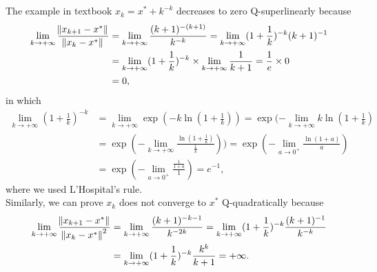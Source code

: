 \documentclass[11pt]{article}
\begin{document}
\maketitle
\section{}
The example in textbook $x_k=x^*+k^{-k}$ decreases to zero Q-superlinearly because \begin{equation}\begin{split}\lim_{k\to+\infty}\frac{\norm{x_{k+1}-x^*}}{\norm{x_{k}-x^*}}&=\lim_{k\to+\infty}\frac{(k+1)^{-(k+1)}}{k^{-k}}=\lim_{k\to+\infty}(1+\frac1k)^{-k}(k+1)^{-1}\\&=\lim_{k\to+\infty}(1+\frac1k)^{-k}\times\lim_{k\to+\infty}\frac1{k+1}=\frac1e\times0\\&=0,\end{split}\nonumber\end{equation} 
in which \begin{equation} \begin{split}\lim_{k\to+\infty} (1+\frac1k)^{-k} &= \lim_{k\to+\infty}\exp(-k\ln(1+\frac1k)) = \exp(-\lim_{k\to+\infty}k\ln(1+\frac1k)\\&=\exp(-\lim_{k\to+\infty} \frac{\ln(1+\frac1k)}{\frac1k}))=\exp(-\lim_{a\to0^+}\frac{\ln(1+a)}a)\\&=\exp(-\lim_{a\to 0^+}\frac{\frac1{1+a}}1)=e^{-1}, \end{split}\nonumber\end{equation} where we used L'Hospital's rule. \\[0.5cm]
Similarly, we can prove ${x_k}$ does not converge to $x^*$ Q-quadratically because \begin{equation}\begin{split}\lim_{k\to+\infty}\frac{\norm{x_{k+1}-x^*}}{\norm{x_{k}-x^*}^2}&=\lim_{k\to+\infty}\frac{(k+1)^{-k-1}}{k^{-2k}}=\lim_{k\to+\infty}(1+\frac1k)^{-k}\frac{(k+1)^{-1}}{k^{-k}}\\&=\lim_{k\to+\infty}(1+\frac1k)^{-k}\frac{k^k}{k+1}=+\infty.\end{split}\nonumber\end{equation}
\end{document}

